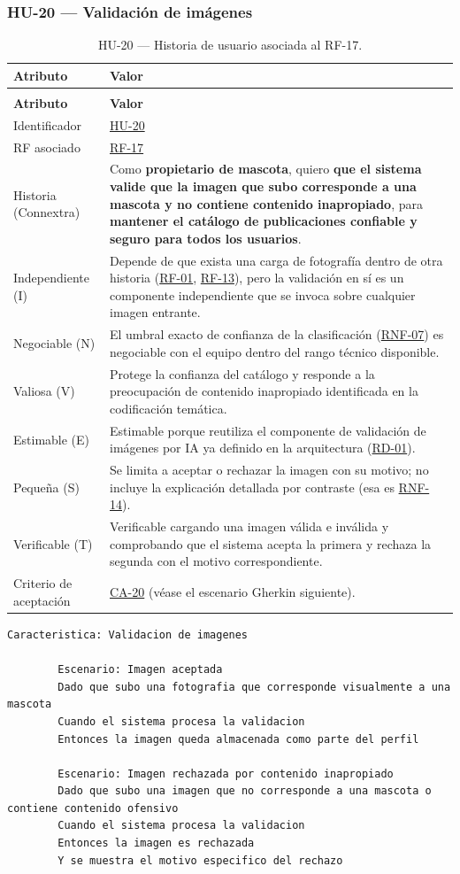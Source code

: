 \documentclass[journal,onecolumn]{IEEEtran}
\makeatletter
\newenvironment{atributos}[2]{%
	\small
	\begin{longtable}{@{}>{\raggedright\arraybackslash}p{4.2cm} >{\raggedright\arraybackslash}p{11.2cm}@{}}
		\caption{#2}\label{tab:#1}\\
		\toprule
		\textbf{Atributo} & \textbf{Valor} \\
		\midrule
		\endfirsthead
		\multicolumn{2}{@{}l}{\small\itshape (continuación)}\\
		\toprule
		\textbf{Atributo} & \textbf{Valor} \\
		\midrule
		\endhead
		\bottomrule
		\endlastfoot
	}{%
	\end{longtable}
	\normalsize
}
\makeatother
\begin{document}
	\subsubsection{HU-20 --- Validación de imágenes}
	
	\begin{atributos}{HU-20}{HU-20 --- Historia de usuario asociada al RF-17.}
		Identificador & \hyperref[tab:HU-20]{HU-20} \\
		RF asociado & \hyperref[tab:RF-17]{RF-17} \\
		Historia (Connextra) & Como \textbf{propietario de mascota}, quiero \textbf{que el sistema valide que la imagen que subo corresponde a una mascota y no contiene contenido inapropiado}, para \textbf{mantener el catálogo de publicaciones confiable y seguro para todos los usuarios}. \\
		Independiente (I) & Depende de que exista una carga de fotografía dentro de otra historia (\hyperref[tab:RF-01]{RF-01}, \hyperref[tab:RF-13]{RF-13}), pero la validación en sí es un componente independiente que se invoca sobre cualquier imagen entrante. \\
		Negociable (N) & El umbral exacto de confianza de la clasificación (\hyperref[tab:RNF-07]{RNF-07}) es negociable con el equipo dentro del rango técnico disponible. \\
		Valiosa (V) & Protege la confianza del catálogo y responde a la preocupación de contenido inapropiado identificada en la codificación temática. \\
		Estimable (E) & Estimable porque reutiliza el componente de validación de imágenes por IA ya definido en la arquitectura (\hyperref[tab:RD-01]{RD-01}). \\
		Pequeña (S) & Se limita a aceptar o rechazar la imagen con su motivo; no incluye la explicación detallada por contraste (esa es \hyperref[tab:RNF-14]{RNF-14}). \\
		Verificable (T) & Verificable cargando una imagen válida e inválida y comprobando que el sistema acepta la primera y rechaza la segunda con el motivo correspondiente. \\
		Criterio de aceptación & \hyperref[lst:ca20]{CA-20} (véase el escenario Gherkin siguiente). \\
	\end{atributos}
	
	\begin{lstlisting}[style=gherkin,caption={CA-20 --- Escenario de aceptación de la historia HU-20.},label={lst:ca20}]
		Caracteristica: Validacion de imagenes
		
		Escenario: Imagen aceptada
		Dado que subo una fotografia que corresponde visualmente a una mascota
		Cuando el sistema procesa la validacion
		Entonces la imagen queda almacenada como parte del perfil
		
		Escenario: Imagen rechazada por contenido inapropiado
		Dado que subo una imagen que no corresponde a una mascota o contiene contenido ofensivo
		Cuando el sistema procesa la validacion
		Entonces la imagen es rechazada
		Y se muestra el motivo especifico del rechazo
	\end{lstlisting}
	
\end{document}
